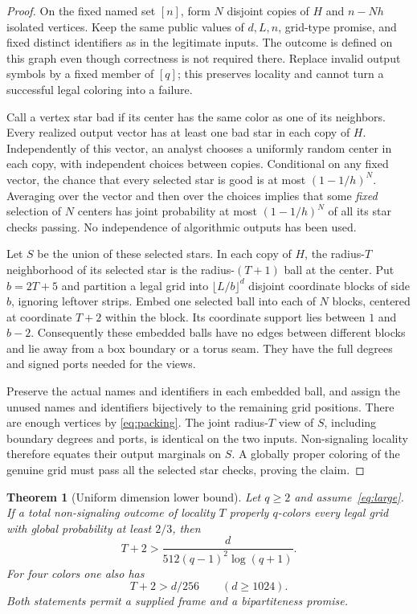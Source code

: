 \documentclass[11pt]{article}
\newtheorem{theorem}{Theorem}[section]
\theoremstyle{definition}\newtheorem{definition}[theorem]{Definition}
\theoremstyle{remark}\newtheorem{remark}[theorem]{Remark}
\begin{document}
\begin{proof}
On the fixed named set $[n]$, form $N$ disjoint copies of $H$ and
$n-Nh$ isolated vertices. Keep the same public values of $d,L,n$,
grid-type promise, and fixed distinct identifiers as in the legitimate
inputs. The outcome is defined on this graph even though correctness
is not required there. Replace invalid output symbols by a fixed
member of $[q]$; this preserves locality and cannot turn a successful
legal coloring into a failure.

Call a vertex star bad if its center has the same color as one of
its neighbors. Every realized output vector has at least one bad
star in each copy of $H$. Independently of this vector, an analyst
chooses a uniformly random center in each copy, with independent
choices between copies. Conditional on any fixed vector, the chance
that every selected star is good is at most $(1-1/h)^N$. Averaging
over the vector and then over the choices implies that some
\emph{fixed} selection of $N$ centers has joint probability at most
$(1-1/h)^N$ of all its star checks passing. No independence of
algorithmic outputs has been used.

Let $S$ be the union of these selected stars. In each copy of $H$,
the radius-$T$ neighborhood of its selected star is the
radius-$(T+1)$ ball at the center. Put $b=2T+5$ and partition a
legal grid into $\lfloor L/b\rfloor^d$ disjoint coordinate blocks
of side $b$, ignoring leftover strips. Embed one selected ball
into each of $N$ blocks, centered at coordinate $T+2$ within the
block. Its coordinate support lies between $1$ and $b-2$.
Consequently these embedded balls have no edges between different
blocks and lie away from a box boundary or a torus seam. They have
the full degrees and signed ports needed for the views.

Preserve the actual names and identifiers in each embedded ball,
and assign the unused names and identifiers bijectively to the
remaining grid positions. There are enough vertices by
\eqref{eq:packing}. The joint radius-$T$ view of $S$, including
boundary degrees and ports, is identical on the two inputs.
Non-signaling locality therefore equates their output marginals
on $S$. A globally proper coloring of the genuine grid must pass
all the selected star checks, proving the claim.
\end{proof}

\begin{theorem}[Uniform dimension lower bound]\label{thm:dimension}
Let $q\ge2$ and assume~\eqref{eq:large}. If a total non-signaling
outcome of locality $T$ properly $q$-colors every legal grid with
global probability at least $2/3$, then
\begin{equation}\label{eq:uniformlower}
                 T+2>\frac{d}{512(q-1)^2\log(q+1)}.
\end{equation}
For four colors one also has
\begin{equation}\label{eq:fourlower}
                       T+2>d/256\qquad(d\ge1024).
\end{equation}
Both statements permit a supplied frame and a bipartiteness promise.
\end{theorem}
\end{document}
